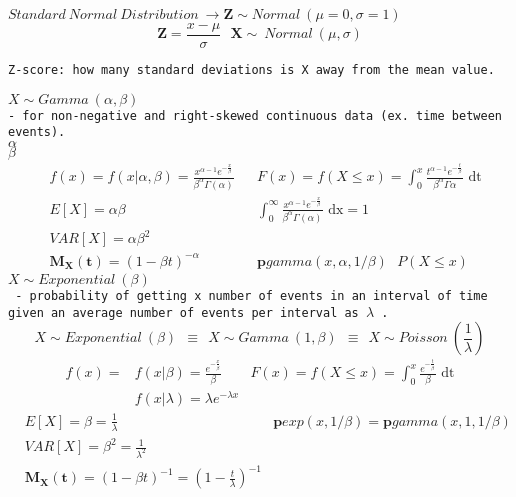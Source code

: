 \documentclass{article}
\begin{document}
$ Standard\ Normal\ Distribution\ \longrightarrow \boldsymbol{Z} \sim Normal\ (\mu = 0, \sigma = 1) $ \\
$$ \boldsymbol{Z} = \frac{x - \mu}{\sigma}\ \ \ \boldsymbol{X}\sim\ Normal\ (\mu,\sigma) $$
\begin{center}
    \texttt{Z-score: how many standard deviations is X away from the mean value.} 
\end{center}
$ X\sim Gamma\ (\alpha,\beta) $ \\
\texttt{- for non-negative and right-skewed continuous data (ex. time between events).} \\
$ \alpha $  \\
$ \beta $ 
\begin{align*}
    & f(x) = f(x|\alpha,\beta) = \frac{x^{\alpha - 1}e^{-\frac{x}{\beta}}}{\beta^{\alpha}\Gamma(\alpha)} && F(x) = f(X \leq x) = \int_{0}^{x}\frac{t^{\alpha-1}e^{-\frac{t}{\beta}}}{\beta^{\alpha}\Gamma{\alpha}} \text{ dt} \\
    & E[X] = \alpha\beta && \int_{0}^{\infty} \frac{x^{\alpha-1}e^{-\frac{x}{\beta}}}{\beta^{\alpha}\Gamma(\alpha)} \text{ dx} = 1 \\
    & VAR[X] = \alpha\beta^{2} \\
    & \boldsymbol{M_X(t)} = (1-\beta t)^{-\alpha} && \boldsymbol{p}gamma(x, \alpha, 1/\beta)\ \ \ P(X \leq x)
\end{align*}
$ X \sim Exponential\ (\beta) $ \\
\texttt{ - probability of getting x number of events in an interval of time given an average number of events per interval as $\lambda$ .}
$$ X \sim Exponential\ (\beta)\ \ \equiv\ \ X \sim Gamma\ (1,\beta)\ \ \equiv\ \ X \sim Poisson\ \left(\frac{1}{\lambda}\right) $$ 
\begin{align*}
    f(x) = & f(x|\beta) = \frac{e^{-\frac{x}{\beta}}}{\beta} & F(x) = f(X \leq x) = \int_{0}^{x} \frac{e^{-\frac{t}{\beta}}}{\beta} \text{ dt} \\
    & f(x|\lambda) = \lambda e^{-\lambda x}
\end{align*}
\begin{align*}
    & E[X] = \beta = \frac{1}{\lambda} & \boldsymbol{p}exp(x,1/\beta) = \boldsymbol{p}gamma(x,1,1/\beta) \\
    & VAR[X] = \beta^{2} = \frac{1}{\lambda^{2}} \\
    & \boldsymbol{M_X(t)} = (1-\beta t)^{-1} = (1-\frac{t}{\lambda})^{-1} 
\end{align*}
\end{document}
